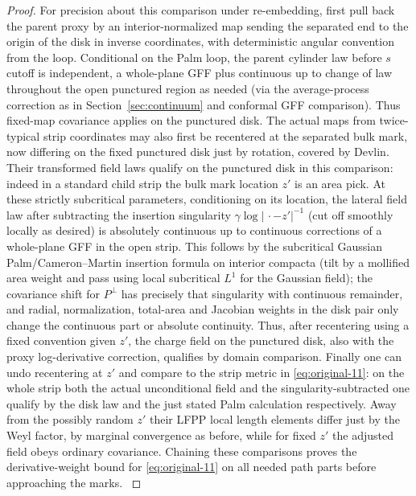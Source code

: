 \begin{proof}
For precision about this comparison under re-embedding, first pull back the parent proxy by an interior-normalized map sending the separated end to the origin of the disk in inverse coordinates, with deterministic angular convention from the loop.
Conditional on the Palm loop, the parent cylinder law before \(s\) cutoff is independent, a whole-plane GFF plus continuous up to change of law throughout the open punctured region as needed (via the average-process correction as in Section~\ref{sec:continuum} and conformal GFF comparison).
Thus fixed-map covariance applies on the punctured disk.
The actual maps from twice-typical strip coordinates may also first be recentered at the separated bulk mark, now differing on the fixed punctured disk just by rotation, covered by Devlin.
Their transformed field laws qualify on the punctured disk in this comparison: indeed in a standard child strip the bulk mark location \(z'\) is an area pick.
At these strictly subcritical parameters, conditioning on its location, the lateral field law after subtracting the insertion singularity \(\gamma\log|\,\cdot-z'|^{-1}\) (cut off smoothly locally as desired) is absolutely continuous up to continuous corrections of a whole-plane GFF in the open strip.
This follows by the subcritical Gaussian Palm/Cameron--Martin insertion formula on interior compacta (tilt by a mollified area weight and pass using local subcritical \(L^1\) for the Gaussian field); the covariance shift for \(P^\perp\) has precisely that singularity with continuous remainder, and radial, normalization, total-area and Jacobian weights in the disk pair only change the continuous part or absolute continuity.
Thus, after recentering using a fixed convention given \(z'\), the charge field on the punctured disk, also with the proxy log-derivative correction, qualifies by domain comparison.
Finally one can undo recentering at \(z'\) and compare to the strip metric in \eqref{eq:original-11}: on the whole strip both the actual unconditional field and the singularity-subtracted one qualify by the disk law and the just stated Palm calculation respectively.
Away from the possibly random \(z'\) their LFPP local length elements differ just by the Weyl factor, by marginal convergence as before, while for fixed \(z'\) the adjusted field obeys ordinary covariance.
Chaining these comparisons proves the derivative-weight bound for \eqref{eq:original-11} on all needed path parts before approaching the marks. \citep{Devlin,AHSwelding}


\end{proof}
